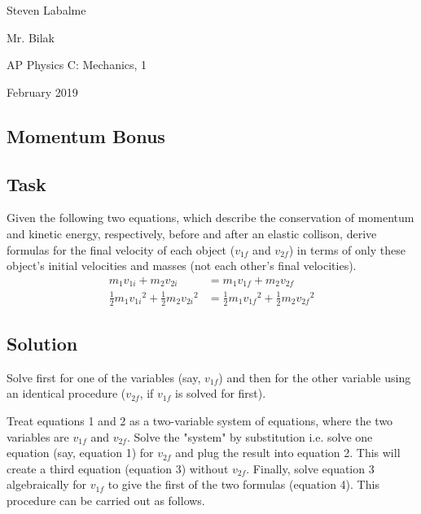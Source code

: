 \documentclass{article}
\begin{document}
\pagestyle{fancy}
\fancyhf{}
\renewcommand{\headrulewidth}{0pt}

\noindent Steven Labalme\par
\noindent Mr. Bilak\par
\noindent AP Physics C: Mechanics, 1\par
{} February 2019\par

\begin{center}
\section{Momentum Bonus}
\end{center}

\subsection{Task}
Given the following two equations, which describe the conservation of momentum and kinetic energy, respectively, before and after an elastic collison, derive formulas for the final velocity of each object ($v_{1f}$ and $v_{2f}$) in terms of only these object's initial velocities and masses (not each other's final velocities).
\begin{align}
    m_1v_{1i}+m_2v_{2i} &= m_1v_{1f}+m_2v_{2f}\\
    \frac{1}{2}m_1{v_{1i}}^2+\frac{1}{2}m_2{v_{2i}}^2 &= \frac{1}{2}m_1{v_{1f}}^2+\frac{1}{2}m_2{v_{2f}}^2
\end{align}

\subsection{Solution}
Solve first for one of the variables (say, $v_{1f}$) and then for the other variable using an identical procedure ($v_{2f}$, if $v_{1f}$ is solved for first).\par
Treat equations 1 and 2 as a two-variable system of equations, where the two variables are $v_{1f}$ and $v_{2f}$. Solve the "system" by substitution i.e. solve one equation (say, equation 1) for $v_{2f}$ and plug the result into equation 2. This will create a third equation (equation 3) without $v_{2f}$. Finally, solve equation 3 algebraically for $v_{1f}$ to give the first of the two formulas (equation 4). This procedure can be carried out as follows.
\end{document}
